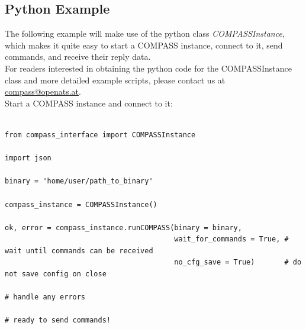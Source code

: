 



\subsection{Python Example}

The following example will make use of the python class \textit{COMPASSInstance}, 
which makes it quite easy to start a COMPASS instance, connect to it, send commands,
and receive their reply data. \\

For readers interested in obtaining the python code for the COMPASSInstance class and 
more detailed example scripts, please contact us at \href{mailto:compass@openats.at}{compass@openats.at}. \\

Start a COMPASS instance and connect to it:

\begin{lstlisting}[basicstyle=\tiny\ttfamily]

from compass_interface import COMPASSInstance

import json

binary = 'home/user/path_to_binary'

compass_instance = COMPASSInstance() 

ok, error = compass_instance.runCOMPASS(binary = binary,
                                        wait_for_commands = True, # wait until commands can be received
                                        no_cfg_save = True)       # do not save config on close

# handle any errors

# ready to send commands!
\end{lstlisting}

